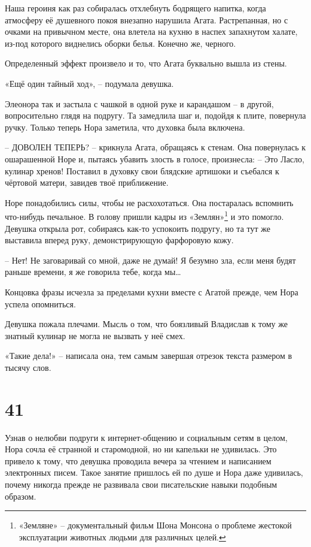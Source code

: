 \documentclass[
  a5paperpaper,
  DIV=11,
  numbers=noendperiod]{scrreprt}
\begin{document}
Наша героиня как раз собиралась отхлебнуть бодрящего напитка, когда
атмосферу её душевного покоя внезапно нарушила Агата. Растрепанная, но с
очками на привычном месте, она влетела на кухню в наспех запахнутом
халате, из-под которого виднелись оборки белья. Конечно же, черного.

Определенный эффект произвело и то, что Агата буквально вышла из стены.

«Ещё один тайный ход», -- подумала девушка.

Элеонора так и застыла с чашкой в одной руке и карандашом -- в другой,
вопросительно глядя на подругу. Та замедлила шаг и, подойдя к плите,
повернула ручку. Только теперь Нора заметила, что духовка была включена.

-- ДОВОЛЕН ТЕПЕРЬ? -- крикнула Агата, обращаясь к стенам. Она
повернулась к ошарашенной Норе и, пытаясь убавить злость в голосе,
произнесла: -- Это Ласло, кулинар хренов! Поставил в духовку свои
блядские артишоки и съебался к чёртовой матери, завидев твоё
приближение.

Норе понадобились силы, чтобы не расхохотаться. Она постаралась
вспомнить что-нибудь печальное. В голову пришли кадры из
«Землян»\footnote{«Земляне» -- документальный фильм Шона Монсона о
  проблеме жестокой эксплуатации животных людьми для различных целей.} и
это помогло. Девушка открыла рот, собираясь как-то успокоить подругу, но
та тут же выставила вперед руку, демонстрирующую фарфоровую кожу.

-- Нет! Не заговаривай со мной, даже не думай! Я безумно зла, если меня
будят раньше времени, я же говорила тебе, когда мы\ldots{}

Концовка фразы исчезла за пределами кухни вместе с Агатой прежде, чем
Нора успела опомниться.

Девушка пожала плечами. Мысль о том, что боязливый Владислав к тому же
знатный кулинар не могла не вызвать у неё смех.

«Такие дела!» -- написала она, тем самым завершая отрезок текста
размером в тысячу слов.

\section*{41}\label{41}


Узнав о нелюбви подруги к интернет-общению и социальным сетям в целом,
Нора сочла её странной и старомодной, но ни капельки не удивилась. Это
привело к тому, что девушка проводила вечера за чтением и написанием
электронных писем. Такое занятие пришлось ей по душе и Нора даже
удивилась, почему никогда прежде не развивала свои писательские навыки
подобным образом.
\end{document}
